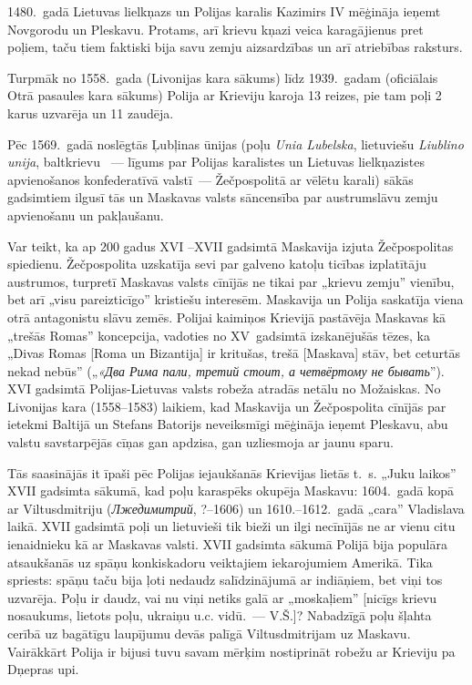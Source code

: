 \documentclass[twoside,a5paper,12pt,fleqn,openany]{extbook}
\newcommand{\pltxti}[1]{\textit{\textpolish{#1}}}
\newcommand{\rutxti}[1]{\textit{\textrussian{#1}}}
\newcommand{\lttxti}[1]{\textit{\textlithuanian{#1}}}
\newcommand{\betxti}[1]{\textit{\textbelarusian{#1}}}
\begin{document}
1480.~gadā Lietuvas lielkņazs un Polijas karalis Kazimirs IV mēģināja ieņemt Novgorodu un Pleskavu. Protams, arī krievu kņazi veica karagājienus pret poļiem, taču tiem faktiski bija savu zemju aizsardzības un arī atriebības raksturs.

Turpmāk no 1558.~gada (Livonijas kara sākums) līdz 1939.~gadam (oficiālais Otrā pasaules kara sākums) Polija ar Krieviju karoja 13 reizes, pie tam poļi 2 karus uzvarēja un 11 zaudēja.

Pēc 1569.~gadā noslēgtās Ļubļinas ūnijas (poļu \pltxti{Unia Lubelska}, lietuviešu \lttxti{Liublino unija}, baltkrievu \betxti{Люблінская унія}~--- līgums par Polijas karalistes un Lietuvas lielkņazistes apvienošanos konfederatīvā valstī~--- Žečpospolitā ar vēlētu karali) sākās gadsimtiem ilgusī tās un Maskavas valsts sāncensība par austrumslāvu zemju apvienošanu un pakļaušanu.

Var teikt, ka ap 200 gadus XVI --XVII gadsimtā Maskavija izjuta Žečpospolitas spiedienu. Žečpospolita uzskatīja sevi par galveno katoļu ticības izplatītāju austrumos, turpretī Maskavas valsts cīnījās ne tikai par „krievu zemju” vienību, bet arī „visu pareizticīgo” kristiešu interesēm. Maskavija un Polija saskatīja viena otrā antagonistu slāvu zemēs. Polijai kaimiņos Krievijā pastāvēja Maskavas kā „trešās Romas” koncepcija, vadoties no XV~gadsimtā izskanējušās tēzes, ka „Divas Romas [Roma un Bizantija] ir kritušas, trešā [Maskava] stāv, bet ceturtās nekad nebūs” („\rutxti{«Два Рима пали, третий стоит, а четвёртому не бывать}”). XVI gadsimtā Polijas-Lietuvas valsts robeža atradās netālu no Možaiskas. No Livonijas kara (1558--1583) laikiem, kad Maskavija un Žečpospolita cīnījās par ietekmi Baltijā un Stefans Batorijs neveiksmīgi mēģināja ieņemt Pleskavu, abu valstu savstarpējās cīņas gan apdzisa, gan uzliesmoja ar jaunu sparu.

Tās saasinājās it īpaši pēc Polijas iejaukšanās Krievijas lietās t.~s. „Juku laikos” XVII gadsimta sākumā, kad poļu karaspēks okupēja Maskavu: 1604.~gadā kopā ar Viltusdmitriju (\rutxti{Лжедимитрий}, ?--1606) un 1610.--1612.~gadā „cara” Vladislava laikā. XVII gadsimtā poļi un lietuvieši tik bieži un ilgi necīnījās ne ar vienu citu ienaidnieku kā ar Maskavas valsti. XVII gadsimta sākumā Polijā bija populāra atsaukšanās uz spāņu konkiskadoru veiktajiem iekarojumiem Amerikā. Tika spriests: spāņu taču bija ļoti nedaudz salīdzinājumā ar indiāņiem, bet viņi tos uzvarēja. Poļu ir daudz, vai nu viņi netiks galā ar „moskaļiem” [nicīgs krievu nosaukums, lietots poļu, ukraiņu u.c. vidū.~--- V.Š.]? Nabadzīgā poļu šļahta cerībā uz bagātīgu laupījumu devās palīgā Viltusdmitrijam uz Maskavu. Vairākkārt Polija ir bijusi tuvu savam mērķim nostiprināt robežu ar Krieviju pa Dņepras upi.
\end{document}
